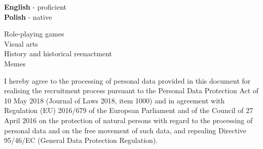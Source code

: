 \documentclass[9pt]{style/developercv}
\begin{document}

\begin{minipage}[t]{0.3\textwidth}
	\vspace{-\baselineskip}


	\textbf{English} - proficient\\
	\textbf{Polish} - native
\end{minipage}
\hfill
\begin{minipage}[t]{0.3\textwidth}
	\vspace{-\baselineskip}
	
	
	Role-playing games\\
	Visual arts\\
	History and historical reenactment\\
	Memes
\end{minipage}


\vspace{1.00cm}

\begin{minipage}[t]{1\textwidth}
	I hereby agree to the processing of personal data provided in this document for 
	realising the recruitment process pursuant to the Personal Data Protection Act
	of 10 May 2018 (Journal of Laws 2018, item 1000) and in agreement with Regulation (EU) 
	2016/679 of the European Parliament and of the Council of 27 April 2016 on the 
	protection of natural persons with regard to the processing of personal data and on 
	the free movement of such data, and repealing Directive 95/46/EC (General Data 
	Protection Regulation).
\end{minipage}
\end{document}
